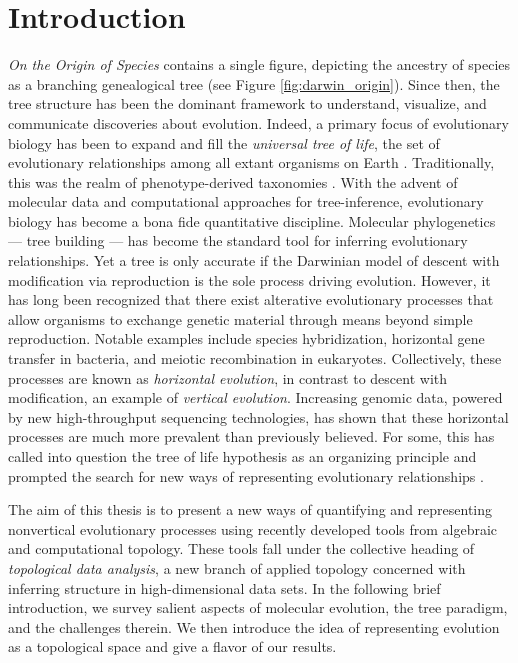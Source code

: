 \chapter{Introduction}
\label{ch:introduction}


\emph{On the Origin of Species} contains a single figure, depicting the ancestry of species as a branching genealogical tree \cite{Darwin:1859uh} (see Figure \ref{fig:darwin_origin}).
Since then, the tree structure has been the dominant framework to understand, visualize, and communicate discoveries about evolution.
Indeed, a primary focus of evolutionary biology has been to expand and fill the \emph{universal tree of life}, the set of evolutionary relationships among all extant organisms on Earth \cite{Bowler:2003uz}.
Traditionally, this was the realm of phenotype-derived taxonomies \kje{[cite]}.
With the advent of molecular data and computational approaches for tree-inference, evolutionary biology has become a bona fide quantitative discipline.
Molecular phylogenetics --- tree building --- has become the standard tool for inferring evolutionary relationships.
Yet a tree is only accurate if the Darwinian model of descent with modification via reproduction is the sole process driving evolution.
However, it has long been recognized that there exist alterative evolutionary processes that allow organisms to exchange genetic material through means beyond simple reproduction.
Notable examples include species hybridization, horizontal gene transfer in bacteria, and meiotic recombination in eukaryotes.
Collectively, these processes are known as \emph{horizontal evolution}, in contrast to descent with modification, an example of \emph{vertical evolution}.
Increasing genomic data, powered by new high-throughput sequencing technologies, has shown that these horizontal processes are much more prevalent than previously believed.
For some, this has called into question the tree of life hypothesis as an organizing principle and prompted the search for new ways of representing evolutionary relationships \cite{Doolittle:1999,OMalley:2011tu}.

The aim of this thesis is to present a new ways of quantifying and representing nonvertical evolutionary processes using recently developed tools from algebraic and computational topology.
These tools fall under the collective heading of \emph{topological data analysis}, a new branch of applied topology concerned with inferring structure in high-dimensional data sets.
In the following brief introduction, we survey salient aspects of molecular evolution, the tree paradigm, and the challenges therein.
We then introduce the idea of representing evolution as a topological space and give a flavor of our results.

